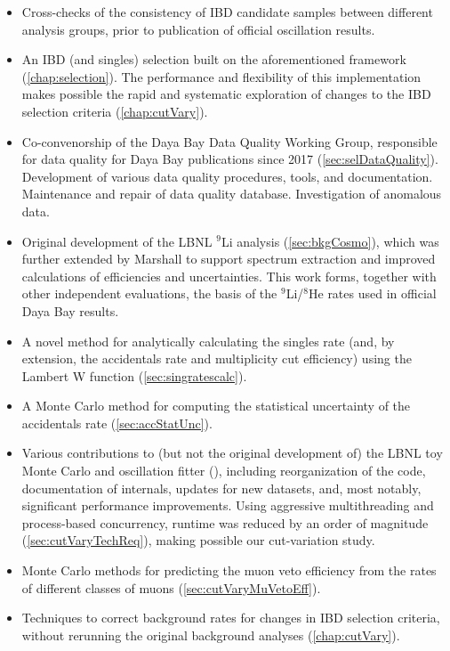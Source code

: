 \documentclass[../thesis.tex]{subfiles}
\begin{document}
\begin{itemize}
  \item Cross-checks of the consistency of IBD candidate samples between different analysis groups, prior to publication of official oscillation results.
  \item An IBD (and singles) selection \cite{IbdSel} built on the aforementioned framework (\autoref{chap:selection}). The performance and flexibility of this implementation makes possible the rapid and systematic exploration of changes to the IBD selection criteria (\autoref{chap:cutVary}).
  \item Co-convenorship of the Daya Bay Data Quality Working Group, responsible for data quality for Daya Bay publications since 2017 (\autoref{sec:selDataQuality}). Development of various data quality procedures, tools, and documentation. Maintenance and repair of data quality database. Investigation of anomalous data.
  \item Original development of the LBNL $^9$Li analysis (\autoref{sec:bkgCosmo}), which was further extended by Marshall \cite{ChrisLi9} to support spectrum extraction and improved calculations of efficiencies and uncertainties. This work forms, together with other independent evaluations, the basis of the $^9$Li/$^8$He rates used in official Daya Bay results.
  \item A novel method for analytically calculating the singles rate (and, by extension, the accidentals rate and multiplicity cut efficiency) using the Lambert W function (\autoref{sec:singratescalc}).
  \item A Monte Carlo method for computing the statistical uncertainty of the accidentals rate (\autoref{sec:accStatUnc}).
  \item Various contributions to (but not the original development of) the LBNL toy Monte Carlo and oscillation fitter (), including reorganization of the code, documentation of internals, updates for new datasets, and, most notably, significant performance improvements. Using aggressive multithreading and process-based concurrency, runtime was reduced by an order of magnitude (\autoref{sec:cutVaryTechReq}), making possible our cut-variation study.
  \item Monte Carlo methods for predicting the muon veto efficiency from the rates of different classes of muons (\autoref{sec:cutVaryMuVetoEff}).
  \item Techniques to correct background rates for changes in IBD selection criteria, without rerunning the original background analyses (\autoref{chap:cutVary}).

\end{itemize}
\end{document}
